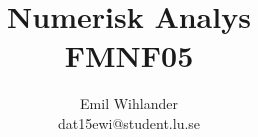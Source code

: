 \documentclass[a4paper]{article}
\title{Numerisk Analys\\ FMNF05}
\author{Emil Wihlander\\ dat15ewi@student.lu.se}
\DeclareMathOperator{\*}{\cdot}
\begin{document}
 
\maketitle
\pagebreak

\end{document}
